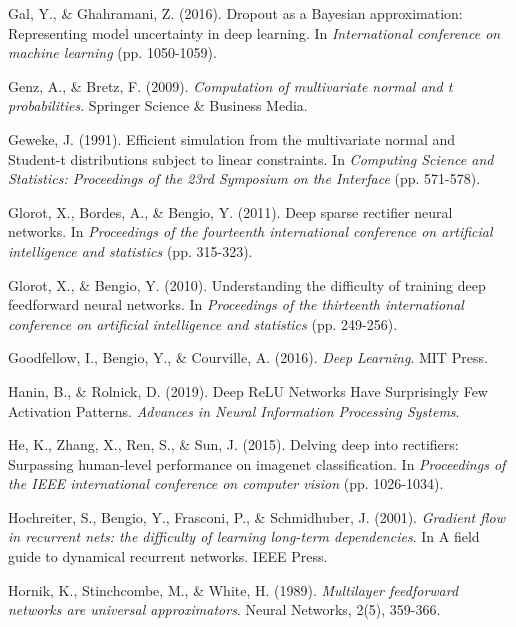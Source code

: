 \begin{thebibliography}{99}
Gal, Y., \& Ghahramani, Z. (2016). Dropout as a Bayesian approximation: Representing model uncertainty in deep learning. In \textit{International conference on machine learning} (pp. 1050-1059).

Genz, A., \& Bretz, F. (2009). \textit{Computation of multivariate normal and t probabilities}. Springer Science \& Business Media.

Geweke, J. (1991). Efficient simulation from the multivariate normal and Student-t distributions subject to linear constraints. In \textit{Computing Science and Statistics: Proceedings of the 23rd Symposium on the Interface} (pp. 571-578).

Glorot, X., Bordes, A., \& Bengio, Y. (2011). Deep sparse rectifier neural networks. In \textit{Proceedings of the fourteenth international conference on artificial intelligence and statistics} (pp. 315-323).

Glorot, X., \& Bengio, Y. (2010). Understanding the difficulty of training deep feedforward neural networks. In \textit{Proceedings of the thirteenth international conference on artificial intelligence and statistics} (pp. 249-256).

Goodfellow, I., Bengio, Y., \& Courville, A. (2016). \textit{Deep Learning}. MIT Press.

Hanin, B., \& Rolnick, D. (2019). Deep ReLU Networks Have Surprisingly Few Activation Patterns. \textit{Advances in Neural Information Processing Systems}.

He, K., Zhang, X., Ren, S., \& Sun, J. (2015). Delving deep into rectifiers: Surpassing human-level performance on imagenet classification. In \textit{Proceedings of the IEEE international conference on computer vision} (pp. 1026-1034).

Hochreiter, S., Bengio, Y., Frasconi, P., \& Schmidhuber, J. (2001). \textit{Gradient flow in recurrent nets: the difficulty of learning long-term dependencies}. In A field guide to dynamical recurrent networks. IEEE Press.

Hornik, K., Stinchcombe, M., \& White, H. (1989). \textit{Multilayer feedforward networks are universal approximators}. Neural Networks, 2(5), 359-366.


\end{thebibliography}
